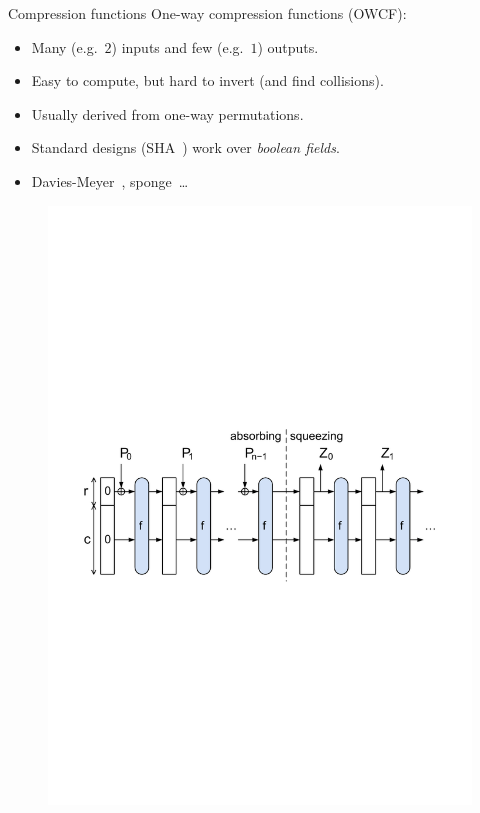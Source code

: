\documentclass{beamer}
\begin{document}
\begin{frame}{Compression functions}
  One-way compression functions (OWCF):
  \begin{itemize}
    \item Many (e.g.\  \(2\)) inputs and few (e.g.\  \(1\)) outputs.
    \item Easy to compute, but hard to invert (and find collisions).
    \item Usually derived from one-way permutations.
    \item Standard designs (SHA~\cite{Dang2015}) work over \emph{boolean fields}.
    \item Davies-Meyer~\cite{Preneel2005}, sponge~\cite{BertoniDPA2007}\dots
  \end{itemize}
  \begin{figure}
    \includegraphics[scale=0.4]{SpongeConstruction.pdf}
  \end{figure}
\end{frame}
\end{document}
